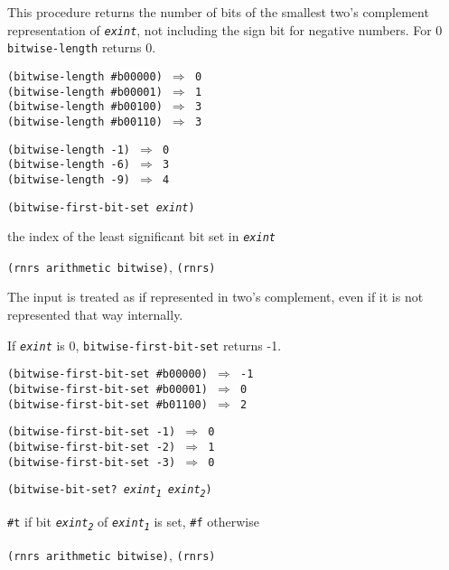 This procedure returns the number of bits of the smallest two's
complement representation of \texttt{\textit{exint}}, not including the sign
bit for negative numbers.
For 0 \texttt{bitwise-length} returns 0.


\begin{alltt}
(bitwise-length \#{}b00000) \(\Rightarrow\) 0
(bitwise-length \#{}b00001) \(\Rightarrow\) 1
(bitwise-length \#{}b00100) \(\Rightarrow\) 3
(bitwise-length \#{}b00110) \(\Rightarrow\) 3

(bitwise-length -1) \(\Rightarrow\) 0
(bitwise-length -6) \(\Rightarrow\) 3
(bitwise-length -9) \(\Rightarrow\) 4
\end{alltt}

\begin{description}

\label{objects_s138}\item[procedure] \texttt{(bitwise-first-bit-set \textit{exint})}



\item[returns] the index of the least significant bit set in \texttt{\textit{exint}}


\item[libraries] \texttt{(rnrs arithmetic bitwise)}, \texttt{(rnrs)}
\end{description}


The input is treated as if represented in two's complement, even
if it is not represented that way internally.


If \texttt{\textit{exint}} is 0, \texttt{bitwise-first-bit-set} returns -1.


\begin{alltt}
(bitwise-first-bit-set \#{}b00000) \(\Rightarrow\) -1
(bitwise-first-bit-set \#{}b00001) \(\Rightarrow\) 0
(bitwise-first-bit-set \#{}b01100) \(\Rightarrow\) 2

(bitwise-first-bit-set -1) \(\Rightarrow\) 0
(bitwise-first-bit-set -2) \(\Rightarrow\) 1
(bitwise-first-bit-set -3) \(\Rightarrow\) 0
\end{alltt}

\begin{description}

\label{objects_s139}\item[procedure] \texttt{(bitwise-bit-set? \textit{exint\textsubscript{1}} \textit{exint\textsubscript{2}})}



\item[returns] \texttt{\#{}t} if bit \texttt{\textit{exint\textsubscript{2}}} of \texttt{\textit{exint\textsubscript{1}}} is set, \texttt{\#{}f} otherwise


\item[libraries] \texttt{(rnrs arithmetic bitwise)}, \texttt{(rnrs)}
\end{description}

